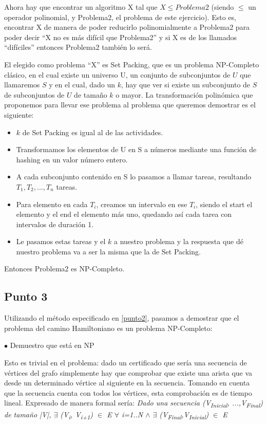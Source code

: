 \documentclass[a4paper,10pt]{article}
\begin{document}
	Ahora hay que encontrar un algoritmo X tal que $X \leq Problema2$ (siendo $\leq$ un operador polinomial, y Problema2, el problema de este ejercicio). Esto es, encontrar X de manera de poder reducirlo polinomialmente a Problema2 para poder decir ``X no es más difícil que Problema2'' y si X es de los llamados “difíciles” entonces Problema2 también lo será.

	El elegido como problema ``X'' es Set Packing, que es un problema NP-Completo clásico, en el cual existe un universo U, un conjunto de subconjuntos de $U$ que llamaremos $S$ y en el cual, dado un $k$, hay que ver si existe un subconjunto de $S$ de subconjuntos de $U$ de tamaño $k$ o mayor. La transformación polinómica que proponemos para llevar ese problema al problema que queremos demostrar es el siguiente:
	\begin{itemize}
		\item $k$ de Set Packing es igual al de las actividades.
		\item Transformamos los elementos de U en S a números mediante una función de hashing en un valor número entero.
		\item A cada subconjunto contenido en S lo pasamos a llamar tareas, resultando $T_1, T_2, ..., T_n$ tareas.
		\item Para elemento en cada $T_i$, creamos un intervalo en ese $T_i$, siendo el start el elemento y el end el elemento más uno, quedando así cada tarea con intervalos de duración 1.
		\item Le pasamos estas tareas y el $k$ a nuestro problema y la respuesta que dé nuestro problema va a ser la misma que la de Set Packing.
	\end{itemize}

	Entonces Problema2 es NP-Completo.

\subsection{Punto 3}
	Utilizando el método especificado en \ref{punto2}, pasamos a demostrar que el problema del camino Hamiltoniano es un problema NP-Completo:

	$\bullet$ Demuestro que está en NP

	Esto es trivial en el problema: dado un certificado que sería una secuencia de vértices del grafo simplemente hay que comprobar que existe una arista que va desde un determinado vértice al siguiente en la secuencia. Tomando en cuenta que la secuencia cuenta con todos los vértices, esta comprobación es de tiempo lineal. Expresado de manera formal sería:
	\emph{Dado  una secuencia (V\textsubscript{Inicial}, ...,V\textsubscript{Final}) de tamaño |V|, $\exists$ (V\textsubscript{i}, V\textsubscript{i+1}) $\in$ E $\forall$ i=1..N $\wedge$ $\exists$ (V\textsubscript{Final},V\textsubscript{Inicial}) $\in$ E }
\end{document}
